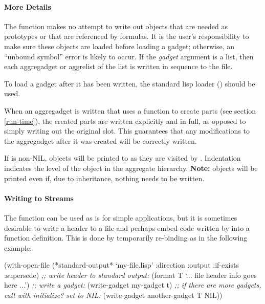 \paragraph{More Details}
The 
function makes no attempt to write out objects that are needed
as prototypes or that are referenced by formulas.
It is the user's responsibility to make sure these objects are loaded
before loading a gadget; otherwise, an ``unbound symbol'' error is
likely to occur.
If the {\it gadget} argument is a list, then each aggregadget or aggrelist
of the list is written in sequence to the file.

To load a gadget after it has been written, the standard lisp loader
() should be used.

When an aggregadget is written that uses a function to create parts
(see section \ref{run-time}), the created parts are written explicitly
and in full, as opposed to simply writing out the original 
slot.  This guarantees that any modifications to the aggregadget after
it was created will be correctly written.

\value{variable}

If  is non-NIL,
objects will be printed to 
as they are visited by .  Indentation indicates the
level of the object in the aggregate hierarchy.  {\bf Note:} objects will
be printed even if, due to inheritance, nothing needs to be written.

\paragraph{Writing to Streams}
The  function can be used as is for simple applications,
but it is sometimes desirable to write a header to a file and perhaps
embed code written by  into a function definition.
This is done by temporarily re-binding  as in the
following example:
\begin{programexample}
(with-open-file (*standard-output* `my-file.lisp'
		 :direction :output :if-exists :supersede)
    {\it ;; write header to standard output:}
    (format T `... file header info goes here ...')
    {\it ;; write a gadget:}
    (write-gadget my-gadget t)
    {\it ;; if there are more gadgets, call with initialize? set to NIL:}
    (write-gadget another-gadget T NIL))
\end{programexample}

